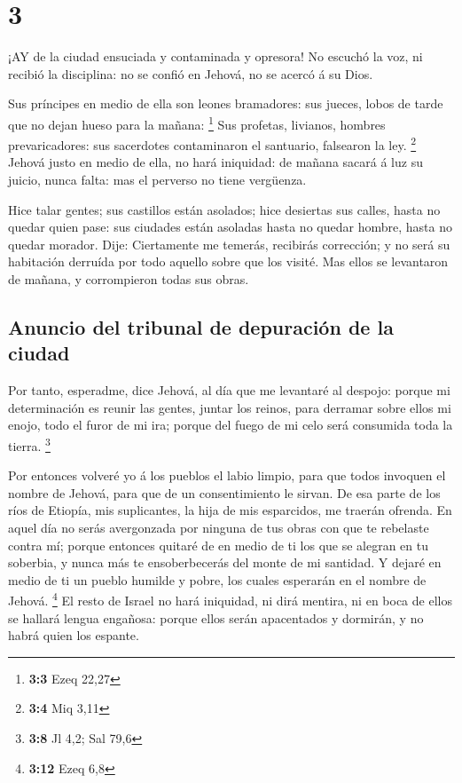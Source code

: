 \hypertarget{section-2}{%
\section{3}\label{section-2}}

 ¡AY de la ciudad ensuciada y contaminada y opresora!
 No escuchó la voz, ni recibió la disciplina: no se confió
en Jehová, no se acercó á su Dios.

 Sus príncipes en medio de ella son leones bramadores: sus
jueces, lobos de tarde que no dejan hueso para la mañana: \footnote{\textbf{3:3}
  Ezeq 22,27}  Sus profetas, livianos, hombres
prevaricadores: sus sacerdotes contaminaron el santuario, falsearon la
ley. \footnote{\textbf{3:4} Miq 3,11}  Jehová justo en medio
de ella, no hará iniquidad: de mañana sacará á luz su juicio, nunca
falta: mas el perverso no tiene vergüenza.

 Hice talar gentes; sus castillos están asolados; hice
desiertas sus calles, hasta no quedar quien pase: sus ciudades están
asoladas hasta no quedar hombre, hasta no quedar morador. 
Dije: Ciertamente me temerás, recibirás corrección; y no será su
habitación derruída por todo aquello sobre que los visité. Mas ellos se
levantaron de mañana, y corrompieron todas sus obras.

\hypertarget{anuncio-del-tribunal-de-depuraciuxf3n-de-la-ciudad}{%
\subsection{Anuncio del tribunal de depuración de la
ciudad}\label{anuncio-del-tribunal-de-depuraciuxf3n-de-la-ciudad}}

 Por tanto, esperadme, dice Jehová, al día que me levantaré
al despojo: porque mi determinación es reunir las gentes, juntar los
reinos, para derramar sobre ellos mi enojo, todo el furor de mi ira;
porque del fuego de mi celo será consumida toda la tierra. \footnote{\textbf{3:8}
  Jl 4,2; Sal 79,6}

 Por entonces volveré yo á los pueblos el labio limpio, para
que todos invoquen el nombre de Jehová, para que de un consentimiento le
sirvan.  De esa parte de los ríos de Etiopía, mis
suplicantes, la hija de mis esparcidos, me traerán ofrenda.
 En aquel día no serás avergonzada por ninguna de tus obras
con que te rebelaste contra mí; porque entonces quitaré de en medio de
ti los que se alegran en tu soberbia, y nunca más te ensoberbecerás del
monte de mi santidad.  Y dejaré en medio de ti un pueblo
humilde y pobre, los cuales esperarán en el nombre de Jehová.
\footnote{\textbf{3:12} Ezeq 6,8}  El resto de Israel no
hará iniquidad, ni dirá mentira, ni en boca de ellos se hallará lengua
engañosa: porque ellos serán apacentados y dormirán, y no habrá quien
los espante.

